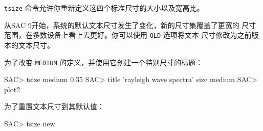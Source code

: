 \texttt{tsize} 命令允许你重新定义这四个标准尺寸的大小以及宽高比。

从SAC 9开始，系统的默认文本尺寸发生了变化，新的尺寸集覆盖了更宽的
尺寸范围，在多数设备上看上去更好。你可以使用 \texttt{OLD} 选项将文本
尺寸修改为之前版本的文本尺寸。

为了改变 \texttt{MEDIUM} 的定义，并使用它创建一个特别尺寸的标题：
\begin{SACCode}
SAC> tsize medium 0.35
SAC> title 'rayleigh wave spectra' size medium
SAC> plot2
\end{SACCode}

为了重置文本尺寸到其默认值：
\begin{SACCode}
SAC> tsize new
\end{SACCode}
